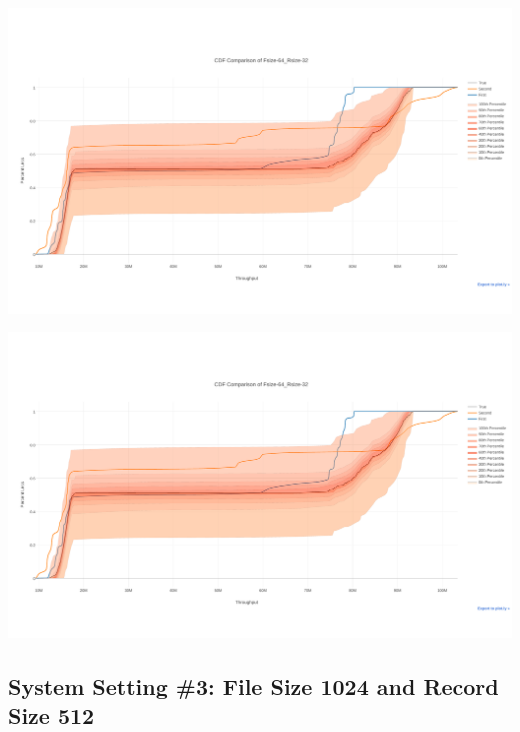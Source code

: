 \documentclass[a4paper,landscape]{article}
\begin{document}
\vspace*{-3.5cm}
\hspace*{-3.5cm}
\includegraphics[page=5,width=27cm]{Raw-and-Fit-Report-Convergence-Over-100-Trials}

\vspace*{-3.5cm}
\hspace*{-3.5cm}
\includegraphics[page=6,width=27cm]{Raw-and-Fit-Report-Convergence-Over-100-Trials}



\pagebreak
\vspace*{0.5cm}
\subsection*{\hfil System Setting \#3: File Size 1024 and Record Size 512 \hfil}
\vspace*{1cm}
\end{document}
